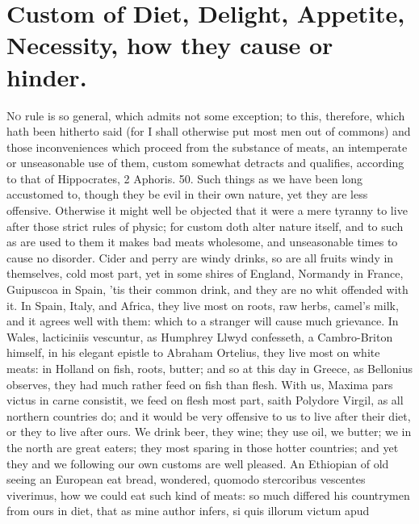 {{%
\section{Custom of Diet, Delight, Appetite, Necessity, how they cause or hinder.}

\lettrine{N}{o} rule is so general, which admits not some exception; to this,
therefore, which hath been hitherto said (for I shall otherwise put
most men out of commons) and those inconveniences which proceed from
the substance of meats, an intemperate or unseasonable use of them,
custom somewhat detracts and qualifies, according to that of
Hippocrates, 2 Aphoris. 50.  Such things as we have been long
accustomed to, though they be evil in their own nature, yet they are
less offensive. Otherwise it might well be objected that it were a mere
tyranny to live after those strict rules of physic; for custom
doth alter nature itself, and to such as are used to them it
makes bad meats wholesome, and unseasonable times to cause no disorder.
Cider and perry are windy drinks, so are all fruits windy in
themselves, cold most part, yet in some shires of England,
Normandy in France, Guipuscoa in Spain, 'tis their common drink, and
they are no whit offended with it. In Spain, Italy, and Africa, they
live most on roots, raw herbs, camel's milk, and it agrees well
with them: which to a stranger will cause much grievance. In Wales,
lacticiniis vescuntur, as Humphrey Llwyd confesseth, a Cambro-Briton
himself, in his elegant epistle to Abraham Ortelius, they live most on
white meats: in Holland on fish, roots, butter; and so at this
day in Greece, as Bellonius observes, they had much rather feed
on fish than flesh. With us, Maxima pars victus in carne consistit, we
feed on flesh most part, saith Polydore Virgil, as all northern
countries do; and it would be very offensive to us to live after their
diet, or they to live after ours. We drink beer, they wine; they use
oil, we butter; we in the north are great eaters; they most
sparing in those hotter countries; and yet they and we following our
own customs are well pleased. An Ethiopian of old seeing an European
eat bread, wondered, quomodo stercoribus vescentes viverimus, how we
could eat such kind of meats: so much differed his countrymen from ours
in diet, that as mine author infers, si quis illorum victum apud
}}
